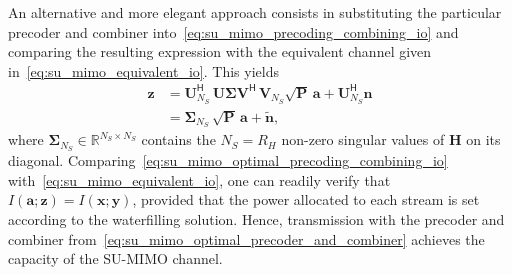 An alternative and more elegant approach consists in substituting the particular precoder and combiner into~\eqref{eq:su_mimo_precoding_combining_io} and comparing the resulting expression with the equivalent channel given in~\eqref{eq:su_mimo_equivalent_io}.
This yields
\begin{subequations}
\label{eq:su_mimo_optimal_precoding_combining_io}
\begin{align}
    \mathbf{z} &= \mathbf{U}_{N_S}^{\mathsf{H}} \, \mathbf{U} \mathbf{\Sigma} \mathbf{V}^{\mathsf{H}} \, \mathbf{V}_{N_S} \sqrt{\mathbf{P}} \, \mathbf{a} + \mathbf{U}_{N_S}^{\mathsf{H}} \mathbf{n} \\
    &= \mathbf{\Sigma}_{N_S} \, \sqrt{\mathbf{P}} \, \mathbf{a} + \tilde{\mathbf{n}},
\end{align}
\end{subequations}
where $\mathbf{\Sigma}_{N_S} \in \mathbb{R}^{N_S \times N_S}$ contains the $N_S = R_H$ non-zero singular values of $\mathbf{H}$ on its diagonal.
Comparing~\eqref{eq:su_mimo_optimal_precoding_combining_io} with~\eqref{eq:su_mimo_equivalent_io}, one can readily verify that $I(\mathbf{a}; \mathbf{z}) = I(\mathbf{x}; \mathbf{y})$, provided that the power allocated to each stream is set according to the waterfilling solution.
Hence, transmission with the precoder and combiner from~\eqref{eq:su_mimo_optimal_precoder_and_combiner} achieves the capacity of the \ac{SU}-\ac{MIMO} channel.
\bigskip


